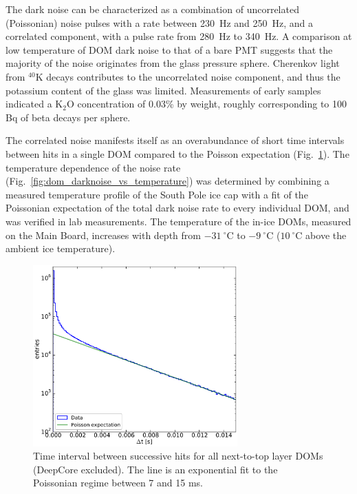 The dark noise can be characterized as a combination of uncorrelated
(Poissonian) noise pulses with a rate between \SI{230}{\hertz} and
\SI{250}{\hertz}, and a correlated component, with a pulse rate from
\SI{280}{\hertz} to \SI{340}{\hertz}.  A comparison at low temperature of
DOM dark noise to that of a bare PMT suggests that the majority of the
noise originates from the glass pressure sphere.  Cherenkov light from
$^{40}\mathrm{K}$ decays contributes to the uncorrelated noise component,
and thus the potassium content of the glass was limited.
Measurements of early samples indicated a $\mathrm{K}_2\mathrm{O}$
concentration of 0.03\% by weight, roughly corresponding to 100 Bq of beta
decays per sphere. 

The correlated noise manifests itself as an overabundance of short time
intervals between hits in a single DOM compared to the Poisson expectation
(Fig.~\ref{fig:darknoise_deltaT}). 
The temperature dependence of the noise rate
(Fig.~\ref{fig:dom_darknoise_vs_temperature}) was determined by combining a
measured temperature profile of 
the South Pole ice cap \cite{price2002temperature} with a fit of the
Poissonian expectation of the total dark noise rate to every individual
DOM, and was verified in lab measurements.  The temperature of the in-ice
DOMs, measured on the Main Board, increases with depth from
$-31\ ^{\circ}\mathrm{C}$ to $-9\ ^{\circ}\mathrm{C}$
($10\ ^{\circ}\mathrm{C}$ above the ambient ice temperature). 

\begin{figure}
  \centering
  \includegraphics[width=0.7\textwidth]{graphics/dom/performance/darknoise/DarkNoise_Layer2Doms.pdf}
 \caption{Time interval between successive hits for all next-to-top layer
   DOMs (DeepCore excluded).  The line is an exponential fit to the
   Poissonian regime between 7 and 15 ms.}
 \label{fig:darknoise_deltaT}
\end{figure}

